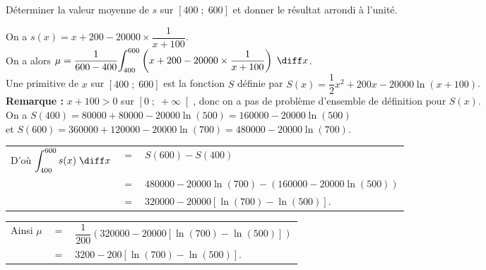 Déterminer la valeur moyenne de $s$ sur $\left[400 \; ; \; 600\right]$ et donner le résultat arrondi à l'unité. \\

\vspace*{.7cm}

On a $s(x) = x + 200 - 20000\times \dfrac{1}{x+100}$. \\

On a alors $\mu = \dfrac{1}{600-400} \displaystyle{\int_{400}^{600} \left(x+200-20000\times \dfrac{1}{x+100}\right) \; \diff x}$. \\

Une primitive de $x$ sur $\left[400 \; ; \; 600\right]$ est la fonction $S$ définie par $S\left(x\right) = \dfrac{1}{2}x^2 + 200x - 20000\ln\left(x+100\right)$. \\

\textbf{Remarque :} $x + 100 > 0$ sur $\left[0 \; ; \; +\infty\right[$, donc on a pas de problème d'ensemble de définition pour $S\left(x\right)$. \\

On a $S(400) = 80 000 + 80000 - 20000 \ln \left(500\right) = 160 000 - 20 000\ln \left(500\right)$ \\ et $S(600) = 360 000 + 120 000 - 20000\ln \left(700\right) = 480 000 - 20 000\ln \left(700\right)$. \\

\begin{tabular}{lll}
\hspace*{-.3cm} D'où $\displaystyle{\int_{400}^{600} s(x) \; \diff x}$ & $=$ & $S(600) - S(400)$ \\
& $=$ & $480 000 - 20 000 \ln \left(700\right) - \left(160 000 - 20 000\ln\left(500\right)\right)$ \\
& $=$ & $320 000 - 20 000\left[\ln\left(700\right) - \ln\left(500\right)\right]$. \\
\end{tabular}

\vspace*{.3cm}

\begin{tabular}{lll}
\hspace{-.3cm} Ainsi $\mu$ & $=$ & $\dfrac{1}{200}\left(320 000 - 20 000 \left[\ln \left(700\right) - \ln \left(500\right)\right]\right)$ \vspace*{.3cm} \\
& $=$ & $3200 - 200\left[\ln\left(700\right) - \ln \left(500\right)\right]$. \\
\end{tabular}


